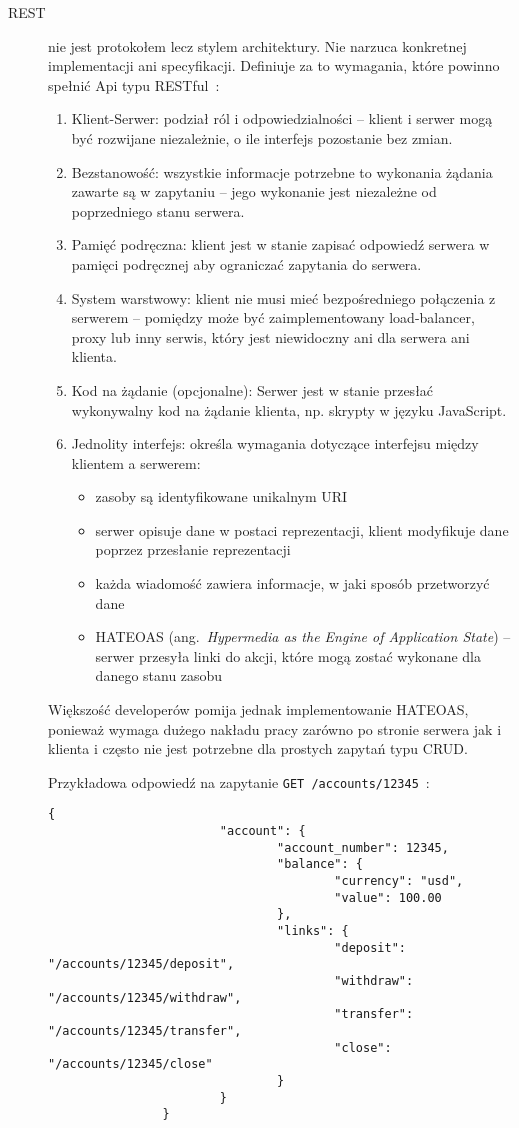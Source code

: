 \begin{description}
		\item[REST] nie jest protokołem lecz stylem architektury.
			Nie narzuca konkretnej implementacji ani specyfikacji. Definiuje za to wymagania, które powinno spełnić Api typu RESTful~\cite{RESTful}:
			\begin{enumerate}
				\item Klient-Serwer: podział ról i odpowiedzialności -- klient i serwer mogą być rozwijane niezależnie, o ile interfejs pozostanie bez zmian.
				\item Bezstanowość: wszystkie informacje potrzebne to wykonania żądania zawarte są w zapytaniu -- jego wykonanie jest niezależne od poprzedniego stanu serwera.
				\item Pamięć podręczna: klient jest w stanie zapisać odpowiedź serwera w pamięci podręcznej aby ograniczać zapytania do serwera.
				\item System warstwowy: klient nie musi mieć bezpośredniego połączenia z serwerem
					-- pomiędzy może być zaimplementowany load-balancer, proxy lub inny serwis, który jest niewidoczny ani dla serwera ani klienta.
				\item Kod na żądanie (opcjonalne): Serwer jest w stanie przesłać wykonywalny kod na żądanie klienta, np. skrypty w języku JavaScript.
				\item Jednolity interfejs: określa wymagania dotyczące interfejsu między klientem a serwerem:
					\begin{itemize}
						\item zasoby są identyfikowane unikalnym URI
						\item serwer opisuje dane w postaci reprezentacji, klient modyfikuje dane poprzez przesłanie reprezentacji
						\item każda wiadomość zawiera informacje, w jaki sposób przetworzyć dane
						\item HATEOAS (ang.\ \emph{Hypermedia as the Engine of Application State})
							-- serwer przesyła linki do akcji, które mogą zostać wykonane dla danego stanu zasobu
					\end{itemize}
			\end{enumerate}

			Większość developerów pomija jednak implementowanie HATEOAS, ponieważ wymaga dużego nakładu pracy zarówno po stronie serwera jak i klienta
			i często nie jest potrzebne dla prostych zapytań typu CRUD.

			Przykładowa odpowiedź na zapytanie \verb|GET /accounts/12345|~\cite{RestMsg}:
			\begin{lstlisting}[label=lst:restRes]
				{
						"account": {
								"account_number": 12345,
								"balance": {
										"currency": "usd",
										"value": 100.00
								},
								"links": {
										"deposit": "/accounts/12345/deposit",
										"withdraw": "/accounts/12345/withdraw",
										"transfer": "/accounts/12345/transfer",
										"close": "/accounts/12345/close"
								}
						}
				}
			\end{lstlisting}
			

\end{description}
